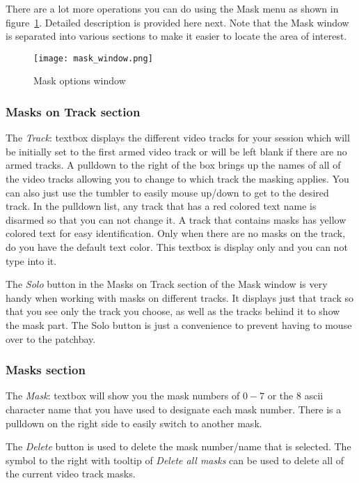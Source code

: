 There are a lot more operations you can do using the Mask menu as shown in 
figure~\ref{fig:mask_window}.  Detailed description is provided here next.  Note that the Mask
window is separated into various sections to make it easier to locate the area of interest.

\begin{figure}[htpb]
    \centering
    \texttt{[image: mask\_window.png]}
    \caption{Mask options window}
    \label{fig:mask_window}
\end{figure}

\subsubsection*{Masks on Track section}%
\label{ssub:masks_track_section}

The \textit{Track}: textbox displays the different video tracks for your session which will be initially set to the first armed video track or will be left blank if there are no armed tracks.  A pulldown to the right of the box brings up the names of all of the video tracks allowing you to change to which track the masking applies.  You can also just use the tumbler to easily mouse up/down to get to the desired track. In the pulldown list, any track that has a red colored text name is disarmed so that you can not change it.  A track that contains masks has yellow colored text for easy identification.  Only when there are no masks on the track, do you have the default text color. This textbox is display only and you can not type into it.

The \textit{Solo} button in the Masks on Track section of the Mask window is very handy when working with masks on different tracks.  It displays just that track so that you see only the track you choose, as well as the tracks behind it to show the mask part.  The Solo button is just a convenience to prevent having to mouse over to the patchbay.

\subsubsection*{Masks section}%
\label{ssub:masks_section}

The \textit{Mask}: textbox will show you the mask numbers of $0-7$ or the 8 ascii character name that you have used to designate each mask number.  There is a pulldown on the right side to easily switch to another mask. 

The \textit{Delete} button is used to delete the mask number/name that is selected. The symbol to the right with tooltip of \textit{Delete all masks} can be used to delete all of the current video track masks.

